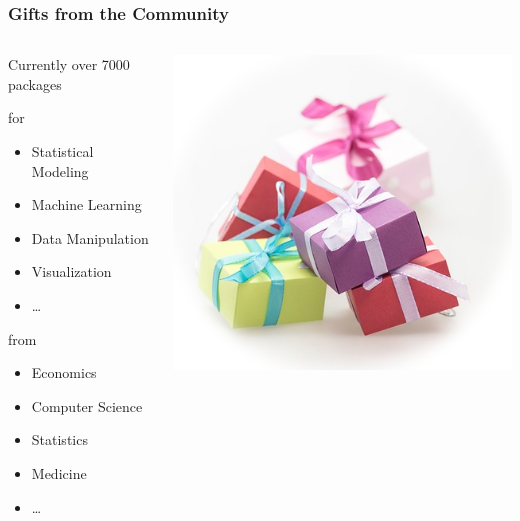 \documentclass{beamer}\usepackage[]{graphicx}\usepackage[]{color}
\begin{document}
\begin{frame}
\frametitle{Gifts from the Community}

\begin{columns}[c]
	\begin{column}{.5\textwidth}
		Currently over 7000 packages \vspace{1em}

		for
		\begin{itemize}
			\item Statistical Modeling
			\item Machine Learning
			\item Data Manipulation
			\item Visualization
			\item \ldots
		\end{itemize}

		from
		\begin{itemize}
			\item Economics
			\item Computer Science
			\item Statistics
			\item Medicine
			\item \ldots
		\end{itemize}

	\end{column}
	\begin{column}{.5\textwidth}
		\includegraphics[width=\textwidth]{figures/packages.png}
	\end{column}
\end{columns}

\end{frame}
\end{document}
